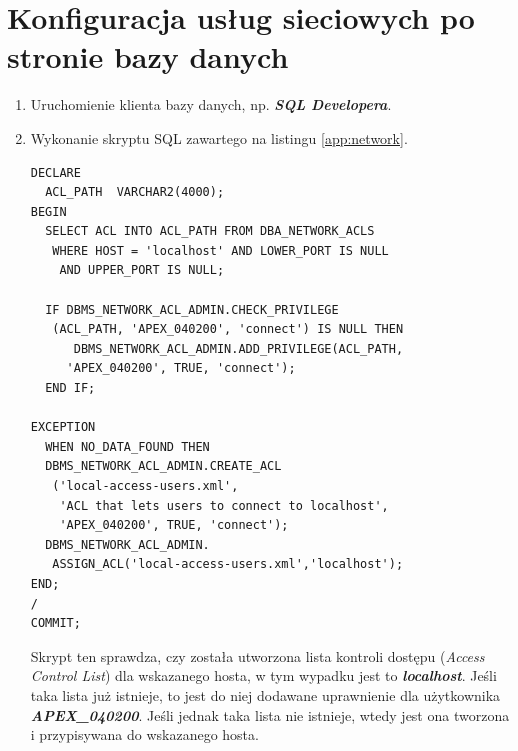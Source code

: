 \documentclass[11pt,a4paper]{article}
\begin{document}
\section{Konfiguracja usług sieciowych po stronie bazy danych} \label{app:conf_db}
\begin{enumerate}
\item Uruchomienie klienta bazy danych, np. \emph{\textbf{SQL Developera}}.
\item Wykonanie skryptu SQL zawartego na listingu \ref{app:network}.

\lstset{language=SQL}
\begin{lstlisting}[frame=single,caption=Skrypt PL/SQL włączający usługi sieciowe w bazie danych,label=app:network]
DECLARE
  ACL_PATH  VARCHAR2(4000);
BEGIN
  SELECT ACL INTO ACL_PATH FROM DBA_NETWORK_ACLS
   WHERE HOST = 'localhost' AND LOWER_PORT IS NULL 
    AND UPPER_PORT IS NULL;
   
  IF DBMS_NETWORK_ACL_ADMIN.CHECK_PRIVILEGE
   (ACL_PATH, 'APEX_040200', 'connect') IS NULL THEN
      DBMS_NETWORK_ACL_ADMIN.ADD_PRIVILEGE(ACL_PATH,
     'APEX_040200', TRUE, 'connect');
  END IF;
  
EXCEPTION
  WHEN NO_DATA_FOUND THEN
  DBMS_NETWORK_ACL_ADMIN.CREATE_ACL
   ('local-access-users.xml',
    'ACL that lets users to connect to localhost',
    'APEX_040200', TRUE, 'connect');
  DBMS_NETWORK_ACL_ADMIN.
   ASSIGN_ACL('local-access-users.xml','localhost');
END;
/
COMMIT;
\end{lstlisting}

Skrypt ten sprawdza, czy została utworzona lista kontroli dostępu (\emph{Access Control List}) dla wskazanego hosta, w tym wypadku jest to \emph{\textbf{localhost}}. Jeśli taka lista już istnieje, to jest do niej dodawane uprawnienie dla użytkownika \emph{\textbf{APEX\_040200}}. Jeśli jednak taka lista nie istnieje, wtedy jest ona tworzona i przypisywana do wskazanego hosta.

\end{enumerate}
\newpage
\end{document}
